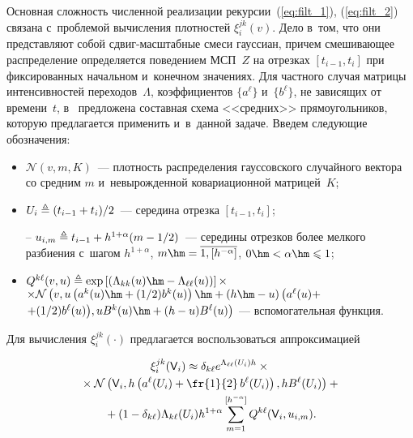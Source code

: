 \begin{multicols}{2}
Основная слож\-ность численной реализации рекурсии~(\ref{eq:filt_1}), 
(\ref{eq:filt_2}) связана с~проблемой вычисления плотностей $\xi_i^{jk}(v)$. 
Дело в~том, что они представляют собой сдвиг-мас\-штаб\-ные смеси гауссиан, причем 
смешивающее распределение определяется поведением МСП~$Z$ на отрезках $[t_{i-1}, t_i]$ 
при фиксированных начальном и~конечном значениях. Для частного случая 
матрицы интенсивностей переходов~$\Lambda$, коэффициентов $\{a^{\ell}\}$ и~$\{b^{\ell}\}$, не зависящих от времени~$t$, в~\cite{B_20_3_IA} предложена 
составная схема <<средних>> прямоугольников, которую предлагается применить 
и~в~данной задаче. Введем сле\-ду\-ющие обозначения:
\begin{itemize}
\item
$\mathcal{N}(v,m,K)$~--- плотность распределения гауссовского случайного вектора 
со средним $m$ и~невырожденной ковариационной матрицей~$K$;
\item
$U_i \triangleq ({t_{i-1}+t_{i}})/{2}$~--- середина отрезка $[t_{i-1}, t_{i}]$;
\item[--]
$u_{i,m} \triangleq t_{i-1} + h^{1+\alpha}(m-{1}/{2})$~--- середины отрезков более 
мелкого разбиения с~шагом $h^{1+\alpha}$, $m\hm=\overline{1,[h^{-\alpha}]}$, $0 \hm< 
\alpha \hm\leqslant 1$;
\item
$Q^{k\ell} (v,u)  \ebd \exp\left[ \left(\Lambda_{kk}(u) \hm- \Lambda_{\ell 
\ell}(u)\right)\right] \times$\linebreak
$\times \mathcal{N}\left(
v, u \left(a^k(u)\hm + ({1}/{2})b^k(u)\right)\hm + (h\hm-u) \left(a^{\ell}(u) +\right.\right.\hspace*{-0.93018pt}$\linebreak 
$\left.\left.\!+({1}/{2})b^{\ell}(u)\right)\!,
u B^k(u) \hm+ (h-u)B^{\ell}(u)\right)
$
--- вспомогательная функция.
\end{itemize}

\vspace*{-1pt}

\noindent
Для вычисления $\xi_i^{jk}(\cdot)$ предлагается воспользоваться аппроксимацией

\vspace*{-5pt}

\noindent
\begin{multline*}
\xi_i^{jk}(\mathsf{V}_i) \approx
\delta_{k\ell}e^{\Lambda_{\ell \ell}(U_i) h}\times{}\\[-1.5pt]
{}\times 
\mathcal{N}\left(
\mathsf{V}_i, h \left(a^{\ell}(U_i) + 
\fr{1}{2}\,b^{\ell}(U_i)\right),
hB^{\ell}(U_i)
\right) +{} \\[-1.5pt]
{}+ (1-\delta_{k\ell}) \Lambda_{k \ell}(U_i) h^{1+\alpha}
\sum\limits_{m=1}^{[h^{-\alpha}]} Q^{k\ell} (\mathsf{V}_i,u_{i,m}).
\end{multline*}


\end{multicols}
